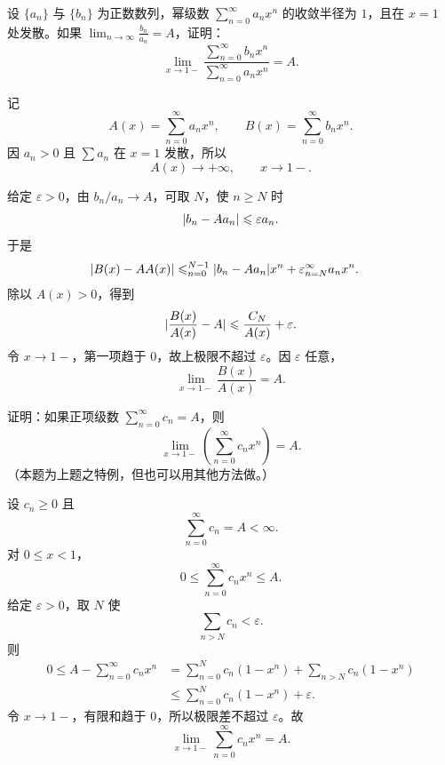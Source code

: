 \begin{xreferenceproblem}[11]
设 $\{a_n\}$ 与 $\{b_n\}$ 为正数数列，幂级数 $\displaystyle\sum_{n=0}^{\infty}a_nx^n$ 的收敛半径为 $1$，且在 $x=1$ 处发散。如果 $\displaystyle\lim_{n\to\infty}\frac{b_n}{a_n}=A$，证明：
  \[
    \lim_{x\to1-}\frac{\displaystyle\sum_{n=0}^{\infty}b_nx^n}{\displaystyle\sum_{n=0}^{\infty}a_nx^n}=A.
  \]
\end{xreferenceproblem}
\begin{xsolution}
记
\[
  A(x)=\sum_{n=0}^{\infty}a_nx^n,
  \qquad
  B(x)=\sum_{n=0}^{\infty}b_nx^n.
\]
因 $a_n>0$ 且 $\sum a_n$ 在 $x=1$ 发散，所以
\[
  A(x)\to+\infty,
  \qquad x\to1-.
\]

给定 $\varepsilon>0$，由 $b_n/a_n\to A$，可取 $N$，使 $n\geqslant N$ 时
\[
  \lvert b_n-Aa_n\rvert\leqslant\varepsilon a_n.
\]
于是
\[
\begin{aligned}
  \lvert B(x)-AA(x)\rvert
  &\leqslant\relax_{n=0}^{N-1}\lvert b_n-Aa_n\rvert x^n
  +\varepsilon\relax_{n=N}^{\infty}a_nx^n.
\end{aligned}
\]
除以 $A(x)>0$，得到
\[
  \lvert\frac{B(x)}{A(x)}-A\rvert
  \leqslant\frac{C_N}{A(x)}+\varepsilon.
\]
令 $x\to1-$，第一项趋于 $0$，故上极限不超过 $\varepsilon$。因 $\varepsilon$ 任意，
\[
  \boxed{
  \lim_{x\to1-}\frac{B(x)}{A(x)}=A}.
\]
\end{xsolution}


\begin{xreferenceproblem}[12]
证明：如果正项级数 $\displaystyle\sum_{n=0}^{\infty}c_n=A$，则
  \[
    \lim_{x\to1-}\left(\sum_{n=0}^{\infty}c_nx^n\right)=A.
  \]
  （本题为上题之特例，但也可以用其他方法做。）
\end{xreferenceproblem}
\begin{xsolution}
设 $c_n\geqslant0$ 且
\[
  \sum_{n=0}^{\infty}c_n=A<\infty.
\]
对 $0\leqslant x<1$，
\[
  0\leqslant\sum_{n=0}^{\infty}c_nx^n\leqslant A.
\]
给定 $\varepsilon>0$，取 $N$ 使
\[
  \sum_{n>N}c_n<\varepsilon.
\]
则
\[
\begin{aligned}
  0\leqslant
  A-\sum_{n=0}^{\infty}c_nx^n
  &=\sum_{n=0}^{N}c_n(1-x^n)
   +\sum_{n>N}c_n(1-x^n)\\
  &\leqslant\sum_{n=0}^{N}c_n(1-x^n)+\varepsilon.
\end{aligned}
\]
令 $x\to1-$，有限和趋于 $0$，所以极限差不超过 $\varepsilon$。故
\[
  \boxed{
  \lim_{x\to1-}\sum_{n=0}^{\infty}c_nx^n=A}.
\]
\end{xsolution}


